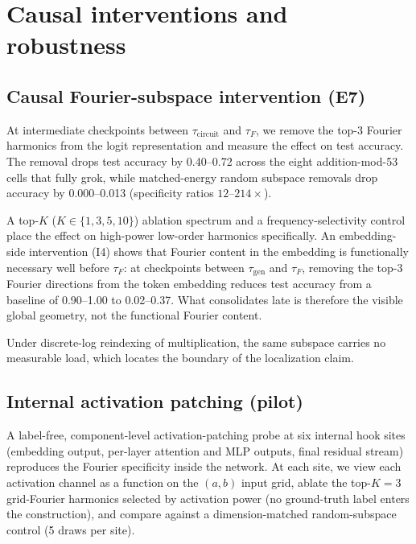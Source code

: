 \documentclass[12pt,openany,a4paper]{book}
\newcommand{\taug}{\tau_{\mathrm{gen}}}
\newcommand{\tauf}{\tau_{F}}
\newcommand{\taucirc}{\tau_{\mathrm{circuit}}}
\begin{document}
\chapter{Causal interventions and robustness}
\label{ch:causal}

\section{Causal Fourier-subspace intervention (E7)}

At intermediate checkpoints between $\taucirc$ and $\tauf$, we remove the top-3 Fourier harmonics from the logit representation and measure the effect on test accuracy. The removal drops test accuracy by 0.40--0.72 across the eight addition-mod-53 cells that fully grok, while matched-energy random subspace removals drop accuracy by 0.000--0.013 (specificity ratios $12$--$214\times$).

A top-$K$ ($K \in \{1,3,5,10\}$) ablation spectrum and a frequency-selectivity control place the effect on high-power low-order harmonics specifically. An embedding-side intervention (I4) shows that Fourier content in the embedding is functionally necessary well before $\tauf$: at checkpoints between $\taug$ and $\tauf$, removing the top-3 Fourier directions from the token embedding reduces test accuracy from a baseline of 0.90--1.00 to 0.02--0.37. What consolidates late is therefore the visible global geometry, not the functional Fourier content.

Under discrete-log reindexing of multiplication, the same subspace carries no measurable load, which locates the boundary of the localization claim.

\section{Internal activation patching (pilot)}

A label-free, component-level activation-patching probe at six internal hook sites (embedding output, per-layer attention and MLP outputs, final residual stream) reproduces the Fourier specificity inside the network. At each site, we view each activation channel as a function on the $(a,b)$ input grid, ablate the top-$K=3$ grid-Fourier harmonics selected by activation power (no ground-truth label enters the construction), and compare against a dimension-matched random-subspace control (5 draws per site).
\end{document}
